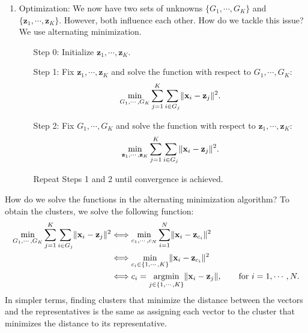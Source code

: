 \documentclass{huhtakm-template-book-v2}
\DeclareMathOperator*{\argmin}{argmin}
\begin{document}
\begin{enumerate}
        \item Optimization: We now have two sets of unknowns $\{G_{1}, \cdots, G_{K}\}$ and $\{\mathbf{z}_{1}, \cdots, \mathbf{z}_{K}\}$. However, both influence each other. How do we tackle this issue? We use alternating minimization.
        \begin{itemize}
            \item[Step 0:] Initialize $\mathbf{z}_{1}, \cdots, \mathbf{z}_{K}$.
            \item[Step 1:] Fix $\mathbf{z}_{1}, \cdots, \mathbf{z}_{K}$ and solve the function with respect to $G_{1}, \cdots, G_{K}$:
            \begin{equation*}
                \min_{G_{1}, \cdots, G_{K}}\sum_{j=1}^{K}\sum_{i \in G_{j}}\lVert{\mathbf{x}_{i} - \mathbf{z}_{j}}\rVert^{2}.
            \end{equation*}
            \item[Step 2:] Fix $G_{1}, \cdots, G_{K}$ and solve the function with respect to $\mathbf{z}_{1}, \cdots, \mathbf{z}_{K}$:
            \begin{equation*}
                \min_{\mathbf{z}_{1}, \cdots, \mathbf{z}_{K}}\sum_{j=1}^{K}\sum_{i \in G_{j}}\lVert{\mathbf{x}_{i} - \mathbf{z}_{j}}\rVert^{2}.
            \end{equation*}
            \item[] Repeat Steps 1 and 2 until convergence is achieved.
        \end{itemize}
    \end{enumerate}
    \newpage

    How do we solve the functions in the alternating minimization algorithm? To obtain the clusters, we solve the following function:
    \begin{align*}
        \min_{G_{1}, \cdots, G_{K}}\sum_{j=1}^{K}\sum_{i \in G_{j}}\norm{\mathbf{x}_{i} - \mathbf{z}_{j}}^{2} &\Longleftrightarrow \min_{c_{1}, \cdots, c_{N}}\sum_{i=1}^{N}\norm{\mathbf{x}_{i} - \mathbf{z}_{c_{i}}}^{2}\\
        &\Longleftrightarrow \min_{c_{i} \in \{1, \cdots, K\}}\norm{\mathbf{x}_{i} - \mathbf{z}_{c_{i}}}^{2}\\
        &\Longleftrightarrow c_{i} = \argmin_{j \in \{1, \cdots, K\}}\norm{\mathbf{x}_{i} - \mathbf{z}_{j}}, \qquad \text{for } i = 1, \cdots, N.
    \end{align*}
    In simpler terms, finding clusters that minimize the distance between the vectors and the representatives is the same as assigning each vector to the cluster that minimizes the distance to its representative.
\end{document}
